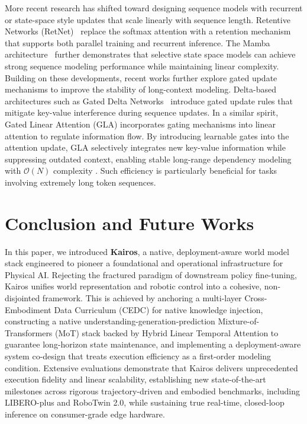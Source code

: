 \documentclass{llmxive}
\begin{document}
More recent research has shifted toward designing sequence models with recurrent or state-space style updates that scale linearly with sequence length. Retentive Networks (RetNet)~\cite{sun2023retentive} replace the softmax attention with a retention mechanism that supports both parallel training and recurrent inference. The Mamba architecture~\cite{gu2024mamba,dao2024transformers,lahoti2026mamba,huang2024localmamba,pei2025efficientvmamba} further demonstrates that selective state space models can achieve strong sequence modeling performance while maintaining linear complexity. 
Building on these developments, recent works further explore gated update mechanisms to improve the stability of long-context modeling. Delta-based architectures such as Gated Delta Networks~\cite{yanggated} introduce gated update rules that mitigate key-value interference during sequence updates. In a similar spirit, Gated Linear Attention (GLA) incorporates gating mechanisms into linear attention to regulate information flow\cite{yang2023gated,li2025minimax}. By introducing learnable gates into the attention update, GLA selectively integrates new key-value information while suppressing outdated context, enabling stable long-range dependency modeling with $\mathcal{O}(N)$ complexity \cite{qin2023hierarchically,qin2024hgrn2,katsch2023gateloop,beck2024xlstm}. Such efficiency is particularly beneficial for tasks involving extremely long token sequences.



\section{Conclusion and Future Works}

In this paper, we introduced \textbf{Kairos}, a native, deployment-aware world model stack engineered to pioneer a foundational and operational infrastructure for Physical AI. Rejecting the fractured paradigm of downstream policy fine-tuning, Kairos unifies world representation and robotic control into a cohesive, non-disjointed framework. This is achieved by anchoring a multi-layer Cross-Embodiment Data Curriculum (CEDC) for native knowledge injection, constructing a native understanding-generation-prediction Mixture-of-Transformers (MoT) stack backed by Hybrid Linear Temporal Attention to guarantee long-horizon state maintenance, and implementing a deployment-aware system co-design that treats execution efficiency as a first-order modeling condition. Extensive evaluations demonstrate that Kairos delivers unprecedented execution fidelity and linear scalability, establishing new state-of-the-art milestones across rigorous trajectory-driven and embodied benchmarks, including LIBERO-plus and RoboTwin 2.0, while sustaining true real-time, closed-loop inference on consumer-grade edge hardware.
\end{document}
